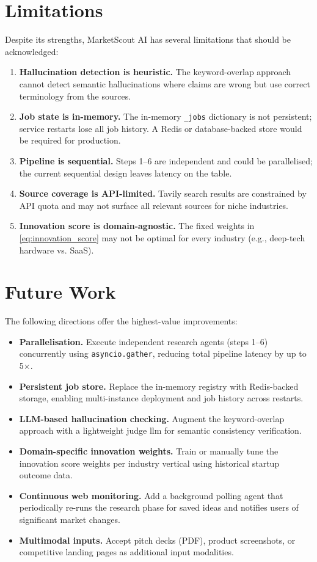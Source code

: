 \documentclass[12pt,a4paper,oneside]{book}
\begin{document}
\section{Limitations}

Despite its strengths, MarketScout AI has several limitations that should be acknowledged:

\begin{enumerate}
  \item \textbf{Hallucination detection is heuristic.} The keyword-overlap approach cannot detect semantic hallucinations where claims are wrong but use correct terminology from the sources.
  \item \textbf{Job state is in-memory.} The in-memory \texttt{\_jobs} dictionary is not persistent; service restarts lose all job history. A Redis or database-backed store would be required for production.
  \item \textbf{Pipeline is sequential.} Steps 1–6 are independent and could be parallelised; the current sequential design leaves latency on the table.
  \item \textbf{Source coverage is API-limited.} Tavily search results are constrained by API quota and may not surface all relevant sources for niche industries.
  \item \textbf{Innovation score is domain-agnostic.} The fixed weights in \cref{eq:innovation_score} may not be optimal for every industry (e.g., deep-tech hardware vs. SaaS).
\end{enumerate}

\section{Future Work}

The following directions offer the highest-value improvements:

\begin{itemize}
  \item \textbf{Parallelisation.} Execute independent research agents (steps 1–6) concurrently using \texttt{asyncio.gather}, reducing total pipeline latency by up to 5$\times$.
  \item \textbf{Persistent job store.} Replace the in-memory registry with Redis-backed storage, enabling multi-instance deployment and job history across restarts.
  \item \textbf{LLM-based hallucination checking.} Augment the keyword-overlap approach with a lightweight judge \gls{llm} for semantic consistency verification.
  \item \textbf{Domain-specific innovation weights.} Train or manually tune the innovation score weights per industry vertical using historical startup outcome data.
  \item \textbf{Continuous web monitoring.} Add a background polling agent that periodically re-runs the research phase for saved ideas and notifies users of significant market changes.
  \item \textbf{Multimodal inputs.} Accept pitch decks (PDF), product screenshots, or competitive landing pages as additional input modalities.
\end{itemize}
\end{document}
